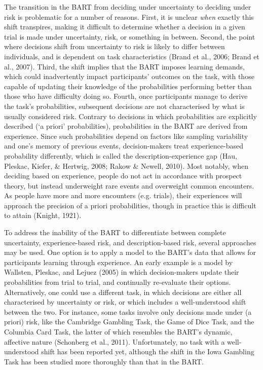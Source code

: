 \documentclass[serif, twocolumn, review]{jote-article}
\begin{document}
The transition in the BART from deciding under uncertainty to deciding under risk is problematic for a number of reasons. First, it is unclear \textit{when} exactly this shift transpires, making it difficult to determine whether a decision in a given trial is made under uncertainty, risk, or something in between. Second, the point where decisions shift from uncertainty to risk is likely to differ between individuals, and is dependent on task characteristics (Brand et al., 2006; Brand et al., 2007). Third, the shift implies that the BART imposes learning demands, which could inadvertently impact participants' outcomes on the task, with those capable of updating their knowledge of the probabilities performing better than those who have difficulty doing so. Fourth, once participants manage to derive the task's probabilities, subsequent decisions are not characterised by what is usually considered risk. Contrary to decisions in which probabilities are explicitly described (`a priori' probabilities), probabilities in the BART are derived from experience. Since such probabilities depend on factors like sampling variability and one's memory of previous events, decision-makers treat experience-based probability differently, which is called the description-experience gap (Hau, Pleskac, Kiefer, \& Hertwig, 2008; Rakow \& Newell, 2010). Most notably, when deciding based on experience, people do not act in accordance with prospect theory, but instead underweight rare events and overweight common encounters. As people have more and more encounters (e.g. trials), their experiences will approach the precision of a priori probabilities, though in practice this is difficult to attain (Knight, 1921).

\label{sec:riskp5}
To address the inability of the BART to differentiate between complete uncertainty, experience-based risk, and description-based risk, several approaches may be used. One option is to apply a model to the BART's data that allows for participants learning through experience. An early example is a model by Wallsten, Pleskac, and Lejuez (2005) in which decision-makers update their probabilities from trial to trial, and continually re-evaluate their options. Alternatively, one could use a different task, in which decisions are either all characterised by uncertainty or risk, or which includes a well-understood shift between the two. For instance, some tasks involve only decisions made under (a priori) risk, like the Cambridge Gambling Task, the Game of Dice Task, and the Columbia Card Task, the latter of which resembles the BART's dynamic, affective nature (Schonberg et al., 2011). Unfortunately, no task with a well-understood shift has been reported yet, although the shift in the Iowa Gambling Task has been studied more thoroughly than that in the BART.
\end{document}
